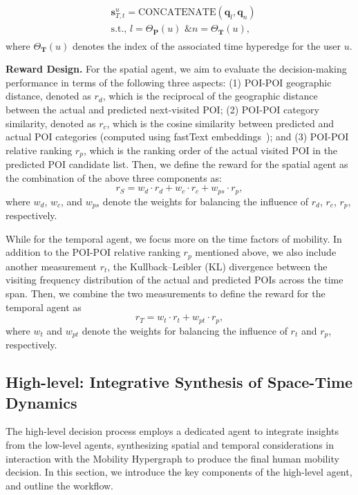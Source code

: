 \documentclass[letterpaper]{article} %
\begin{document}
\begin{align}
\begin{split}
    &\mathbf{s}^{u}_{T, t} = \text{CONCATENATE} (\mathbf{q}_l, \mathbf{q}_n) \\
    &\text{s.t., }l=\Theta_{\mathbf{P}}(u) \text{ \& }
 n=\Theta_{\mathbf{T}}(u),
 \end{split}
\end{align}
where $\Theta_{\mathbf{T}}(u)$ denotes the index of the associated time hyperedge for the user $u$.


\noindent\textbf{Reward Design. }
For the spatial agent, we aim to evaluate the decision-making performance in terms of the following three aspects:
(1) POI-POI geographic distance, denoted as $ r_d $, which is the reciprocal of the geographic distance between the actual and predicted next-visited POI;
(2) POI-POI category similarity, denoted as $ r_c $, which is the cosine similarity between predicted and actual POI categories (computed using fastText embeddings~\cite{bojanowski2017enriching}); and
(3) POI-POI relative ranking $ r_p $, which is the ranking order of the actual visited POI in the predicted POI candidate list.
Then, we define the reward for the spatial agent as the combination of the above three components as:
\begin{equation}
r_{S} = w_{d} \cdot r_{d} + w_{c} \cdot r_{c} + w_{ps} \cdot r_{p},
\end{equation}
where  $ w_{d} $, $ w_{c} $, and $ w_{ps} $ denote the weights for balancing the influence of $r_d$, $r_c$, $r_p$, respectively.

While for the temporal agent, we focus more on the time factors of mobility.
In addition to the POI-POI relative ranking $ r_p $ mentioned above, we also include another measurement $r_t$, the Kullback–Leibler (KL) divergence between the visiting frequency distribution of the actual and predicted POIs across the time span.
Then, we combine the two measurements to define the reward for the temporal agent as
\begin{equation}
    r_{T} = w_{t} \cdot r_{t} + w_{pt} \cdot r_{p},
\end{equation}
where $w_{t}$ and $w_{pt}$ denote the weights for balancing the influence of $r_t$ and $r_p$, respectively.


\subsection{High-level: Integrative Synthesis of Space-Time Dynamics}
The high-level decision process employs a dedicated agent to integrate insights from the low-level agents, synthesizing spatial and temporal considerations in interaction with the Mobility Hypergraph to produce the final human mobility decision.
In this section, we introduce the key components of the high-level agent, and outline the workflow.
\end{document}
